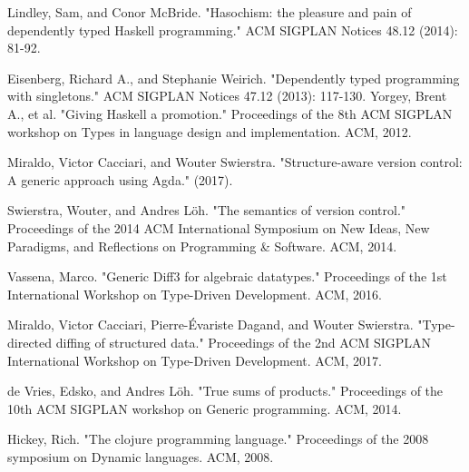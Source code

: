 \documentclass[11pt]{article}
\begin{document}
\begin{thebibliography}{9}  
  Lindley, Sam, and Conor McBride. "Hasochism: the pleasure and pain of dependently typed Haskell programming." ACM SIGPLAN Notices 48.12 (2014): 81-92.

  Eisenberg, Richard A., and Stephanie Weirich. "Dependently typed programming with singletons." ACM SIGPLAN Notices 47.12 (2013): 117-130.
  Yorgey, Brent A., et al. "Giving Haskell a promotion." Proceedings of the 8th ACM SIGPLAN workshop on Types in language design and implementation. ACM, 2012.
  
   Miraldo, Victor Cacciari, and Wouter Swierstra. "Structure-aware version control: A generic approach using Agda." (2017).

  Swierstra, Wouter, and Andres Löh. "The semantics of version control." Proceedings of the 2014 ACM International Symposium on New Ideas, New Paradigms, and Reflections on Programming & Software. ACM, 2014.
  
  Vassena, Marco. "Generic Diff3 for algebraic datatypes." Proceedings of the 1st International Workshop on Type-Driven Development. ACM, 2016.

  Miraldo, Victor Cacciari, Pierre-Évariste Dagand, and Wouter Swierstra. "Type-directed diffing of structured data." Proceedings of the 2nd ACM SIGPLAN International Workshop on Type-Driven Development. ACM, 2017.
  
  de Vries, Edsko, and Andres Löh. "True sums of products." Proceedings of the 10th ACM SIGPLAN workshop on Generic programming. ACM, 2014.
  
Hickey, Rich. "The clojure programming language." Proceedings of the 2008 symposium on Dynamic languages. ACM, 2008.
 \end{thebibliography}
\end{document}
